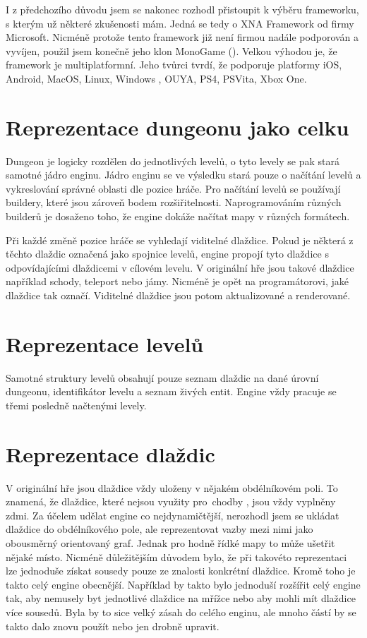 I z předchozího důvodu jsem se nakonec rozhodl přistoupit k výběru frameworku, s kterým už některé zkušenosti mám. Jedná se 
tedy o XNA Framework od firmy Microsoft. Nicméně protože tento framework již není firmou nadále podporován a vyvíjen, použil jsem 
konečně jeho klon MonoGame (\citet{MonoGame}). Velkou výhodou je, že framework je multiplatformní. Jeho tvůrci tvrdí, že podporuje platformy
iOS, Android, MacOS, Linux, Windows , OUYA, PS4, PSVita, Xbox One.

\section{Reprezentace dungeonu jako celku}
Dungeon je logicky rozdělen do jednotlivých levelů, o tyto levely se pak stará samotné jádro enginu. Jádro enginu se ve výsledku stará
pouze o načítání levelů a vykreslování správné oblasti dle pozice hráče. Pro načítání levelů se používají buildery, které jsou zároveň
bodem rozšiřitelnosti. Naprogramováním různých builderů je dosaženo toho, že engine dokáže načítat mapy v různých formátech.

Při každé změně pozice hráče se vyhledají viditelné dlaždice. Pokud je některá z těchto dlaždic označená jako spojnice levelů,
engine propojí tyto dlaždice s odpovídajícími dlaždicemi v cílovém levelu. V originální hře jsou takové dlaždice například schody,
teleport nebo jámy. Nicméně je opět na programátorovi, jaké dlaždice tak označí. Viditelné dlaždice jsou potom aktualizované a renderované.

\section{Reprezentace levelů}
Samotné struktury levelů obsahují pouze seznam dlaždic na dané úrovní dungeonu, identifikátor levelu a seznam živých entit. 
Engine vždy pracuje se třemi posledně načtenými levely.

\section{Reprezentace dlaždic} 
V originální hře jsou dlaždice vždy uloženy v nějakém obdélníkovém poli. To znamená, že dlaždice, které nejsou využity pro~chodby
, jsou vždy vyplněny zdmi. Za účelem udělat engine co nejdynamičtější, nerozhodl jsem se ukládat dlaždice
do obdélníkového pole, ale reprezentovat vazby mezi nimi jako obousměrný orientovaný graf. Jednak pro hodně řídké mapy to může
ušetřit nějaké místo. Nicméně důležitějším důvodem bylo, že při takovéto reprezentaci lze jednoduše získat sousedy pouze
ze znalosti konkrétní dlaždice. Kromě toho je takto celý engine obecnější. Například by takto bylo jednoduší rozšířit celý engine
tak, aby nemusely byt jednotlivé dlaždice na mřížce nebo aby mohli mít dlaždice více sousedů. Byla by to sice velký zásah do celého 
enginu, ale mnoho částí by se takto dalo znovu použít nebo jen drobně upravit.

